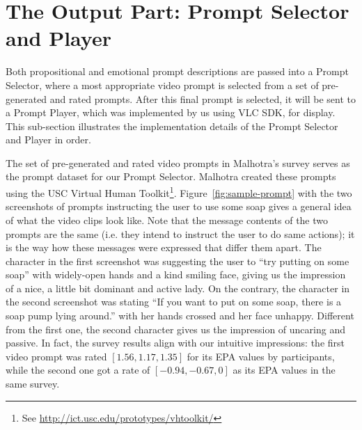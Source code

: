 \section{The Output Part: Prompt Selector and Player}
\label{sec:impl-output}

Both propositional and emotional prompt descriptions are passed into a Prompt Selector, where a most appropriate video prompt is selected from a set of pre- generated and rated prompts. After this final prompt is selected, it will be sent to a Prompt Player, which was implemented by us using VLC SDK, for display. This sub-section illustrates the implementation details of the Prompt Selector and Player in order.

The set of pre-generated and rated video prompts in Malhotra's survey \cite{malhotra2014} serves as the prompt dataset for our Prompt Selector. Malhotra created these prompts using the USC Virtual Human Toolkit\footnote{See \url{http://ict.usc.edu/prototypes/vhtoolkit/}}. Figure~\ref{fig:sample-prompt} with the two screenshots of prompts instructing the user to use some soap gives a general idea of what the video clips look like. Note that the message contents of the two prompts are the same (i.e. they intend to instruct the user to do same actions); it is the way how these messages were expressed that differ them apart. The character in the first screenshot was suggesting the user to ``try putting on some soap'' with widely-open hands and a kind smiling face, giving us the impression of a nice, a little bit dominant and active lady. On the contrary, the character in the second screenshot was stating ``If you want to put on some soap, there is a soap pump lying around.'' with her hands crossed and her face unhappy. Different from the first one, the second character gives us the impression of uncaring and passive. In fact, the survey results align with our intuitive impressions: the first video prompt was rated $[1.56, 1.17, 1.35]$ for its EPA values by participants, while the second one got a rate of  $[-0.94, -0.67, 0]$ as its EPA values in the same survey.


